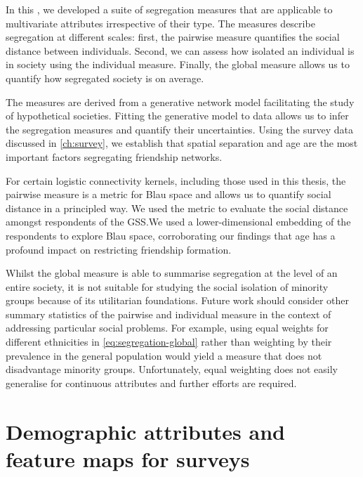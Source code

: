 \documentclass{scrartcl}
\begin{document}
In this , we developed a suite of segregation measures that are applicable to multivariate attributes irrespective of their type. The measures describe segregation at different scales: first, the pairwise measure quantifies the social distance between individuals. Second, we can assess how isolated an individual is in society using the individual measure. Finally, the global measure allows us to quantify how segregated society is on average.

The measures are derived from a generative network model facilitating the study of hypothetical societies. Fitting the generative model to data allows us to infer the segregation measures and quantify their uncertainties. Using the survey data discussed in \cref{ch:survey}, we establish that spatial separation and age are the most important factors segregating friendship networks.

For certain logistic connectivity kernels, including those used in this thesis, the pairwise measure is a metric for Blau space and allows us to quantify social distance in a principled way. We used the metric to evaluate the social distance amongst respondents of the GSS.\@ We used a lower-dimensional embedding of the respondents to explore Blau space, corroborating our findings that age has a profound impact on restricting friendship formation.

Whilst the global measure is able to summarise segregation at the level of an entire society, it is not suitable for studying the social isolation of minority groups because of its utilitarian foundations. Future work should consider other summary statistics of the pairwise and individual measure in the context of addressing particular social problems. For example, using equal weights for different ethnicities in \cref{eq:segregation-global} rather than weighting by their prevalence in the general population would yield a measure that does not disadvantage minority groups. Unfortunately, equal weighting does not easily generalise for continuous attributes and further efforts are required.


\printbibliography

\appendix

\section{Demographic attributes and feature maps for surveys}
\end{document}
